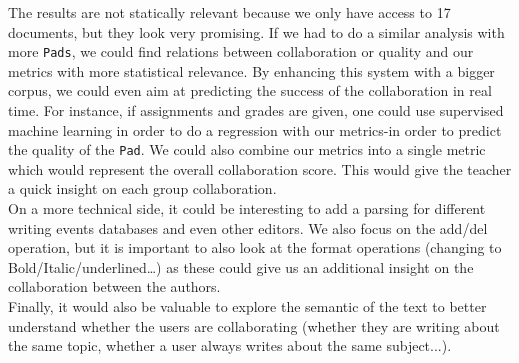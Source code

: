 \documentclass[a4, twocolumn, 12pt]{article}
\begin{document}
The results are not statically relevant because we only have access to 17 documents, but they look very promising. If we had to do a similar analysis with more \texttt{Pads}, we could find relations between collaboration or quality and our metrics with more statistical relevance. By enhancing this system with a bigger corpus, we could even aim at predicting the success of the collaboration in real time. For instance, if assignments and grades are given, one could use supervised machine learning in order to do a regression with our metrics-in order to predict the quality of the \texttt{Pad}. We could also combine our metrics into a single metric which would represent the overall collaboration score. This would give the teacher a quick insight on each group collaboration. \\
On a more technical side, it could be interesting to add a parsing for different writing events databases and even other editors. We also focus on the add/del operation, but it is important to also look at the format operations (changing to Bold/Italic/underlined…) as these could give us an additional insight on the collaboration between the authors. \\
Finally, it would also be valuable to explore the semantic of the text to better understand whether the users are collaborating (whether they are writing about the same topic, whether a user always writes about the same subject...).



\end{document}
